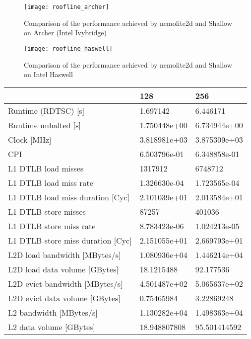 \documentclass[12pt]{article}
\begin{document}
\begin{figure}
\centering
\texttt{[image: roofline\_archer]}
\caption{Comparison of the performance achieved by nemolite2d and Shallow on Archer (Intel Ivybridge)}
\label{FIG_roofline_archer}
\end{figure}

\begin{figure}
\centering
\texttt{[image: roofline\_haswell]}
\caption{Comparison of the performance achieved by nemolite2d and Shallow on Intel Haswell}
\label{FIG_roofline_haswell}
\end{figure}

\begin{table}
\begin{tabular}{l|l|l}
\hline
\hline
                                    &    128       &   256 \\
\hline
        Runtime (RDTSC) [s]        &   1.697142   &     6.446171  \\
        Runtime unhalted [s]       & 1.750448e+00 &   6.734944e+00 \\
            Clock [MHz]            & 3.818981e+03 &   3.875309e+03 \\
                CPI                & 6.503796e-01 &   6.348858e-01 \\
\hline
        L1 DTLB load misses        &    1317912   &    6748712   \\
       L1 DTLB load miss rate      & 1.326630e-04 & 1.723565e-04 \\
  L1 DTLB load miss duration [Cyc] & 2.101039e+01 & 2.013584e+01 \\
        L1 DTLB store misses       &     87257    &    401036    \\
      L1 DTLB store miss rate      & 8.783423e-06 & 1.024213e-05 \\
 L1 DTLB store miss duration [Cyc] & 2.151055e+01 & 2.669793e+01 \\
\hline
  L2D load bandwidth [MBytes/s] & 1.080936e+04 & 1.446214e+04 \\
  L2D load data volume [GBytes] &  18.1215488  &   92.177536  \\
 L2D evict bandwidth [MBytes/s] & 4.501487e+02 & 5.065637e+02 \\
 L2D evict data volume [GBytes] &  0.75465984  &  3.22869248  \\
     L2 bandwidth [MBytes/s]    & 1.130282e+04 & 1.498363e+04 \\
     L2 data volume [GBytes]    & 18.948807808 & 95.501414592 \\

\end{tabular}
\end{table}
\end{document}
